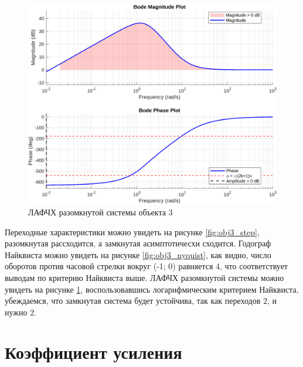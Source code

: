 \begin{figure}[H]
    \centering
    \includegraphics[width=\textwidth]{figs/task_1_obj_3_bode.png}
    \caption{ЛАФЧХ разомкнутой системы объекта 3}
    \label{fig:obj3_bode}
\end{figure}

Переходные характеристики можно увидеть на рисунке \ref{fig:obj3_step},
разомкнутая рассходится, а замкнутая асимптотичесхи сходится. 
Годограф Найквиста можно увидеть на рисунке 
\ref{fig:obj3_nyquist}, как видно, число оборотов против часовой стрелки
вокруг (-1; 0) равняется 4, что соответствует выводам по критерию Найквиста
выше. ЛАФЧХ разомкнутой системы можно увидеть на рисунке \ref{fig:obj3_bode},
воспользовавшись логарифмическим критерием Найквиста, убеждаемся, что 
замкнутая система будет устойчива, так как переходов $2$, и нужно $2$.


\section{Коэффициент усиления}

